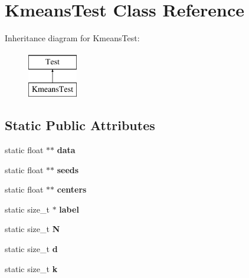 \hypertarget{classKmeansTest}{\section{Kmeans\-Test Class Reference}
\label{classKmeansTest}
}
Inheritance diagram for Kmeans\-Test\-:\begin{figure}[H]
\begin{center}
\leavevmode
\includegraphics[height=2.000000cm]{classKmeansTest}
\end{center}
\end{figure}
\subsection*{Static Public Attributes}
\begin{DoxyCompactItemize}
\item 
\hypertarget{classKmeansTest_a18aaa1ba5666779f6ef0a5c9db9957a0}{static float $\ast$$\ast$ {\bfseries data}}\label{classKmeansTest_a18aaa1ba5666779f6ef0a5c9db9957a0}

\item 
\hypertarget{classKmeansTest_a493ada19849e95750f452c2ecb2de9a4}{static float $\ast$$\ast$ {\bfseries seeds}}\label{classKmeansTest_a493ada19849e95750f452c2ecb2de9a4}

\item 
\hypertarget{classKmeansTest_a301b4d6e05dc8f93a004de9449f95a16}{static float $\ast$$\ast$ {\bfseries centers}}\label{classKmeansTest_a301b4d6e05dc8f93a004de9449f95a16}

\item 
\hypertarget{classKmeansTest_ae25f43aeeaaad29520c550100821ea82}{static size\-\_\-t $\ast$ {\bfseries label}}\label{classKmeansTest_ae25f43aeeaaad29520c550100821ea82}

\item 
\hypertarget{classKmeansTest_a7d32bfe503e5b042220c639505196b79}{static size\-\_\-t {\bfseries N}}\label{classKmeansTest_a7d32bfe503e5b042220c639505196b79}

\item 
\hypertarget{classKmeansTest_a243fbe94bc83dbe4afeca71acf195291}{static size\-\_\-t {\bfseries d}}\label{classKmeansTest_a243fbe94bc83dbe4afeca71acf195291}

\item 
\hypertarget{classKmeansTest_a9016aa5451c1a42a1f3a530ecac84891}{static size\-\_\-t {\bfseries k}}\label{classKmeansTest_a9016aa5451c1a42a1f3a530ecac84891}

\end{DoxyCompactItemize}
